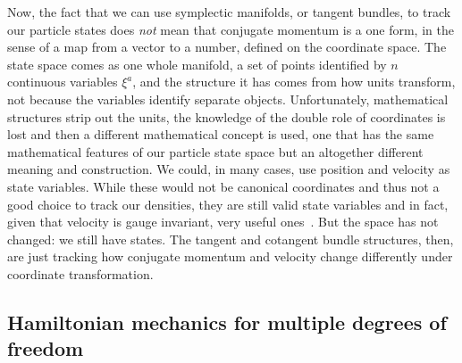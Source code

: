 \documentclass[11pt]{elsarticle}
\begin{document}
Now, the fact that we can use symplectic manifolds, or tangent bundles, to track our particle states does \emph{not} mean that conjugate momentum is a one form, in the sense of a map from a vector to a number, defined on the coordinate space. The state space comes as one whole manifold, a set of points identified by $n$ continuous variables $\xi^a$, and the structure it has comes from how units transform, not because the variables identify separate objects. Unfortunately, mathematical structures strip out the units, the knowledge of the double role of coordinates is lost and then a different mathematical concept is used, one that has the same mathematical features of our particle state space but an altogether different meaning and construction. We could, in many cases, use position and velocity as state variables. While these would not be canonical coordinates and thus not a good choice to track our densities, they are still valid state variables and in fact, given that velocity is gauge invariant, very useful ones~\cite{Holten}. But the space has not changed: we still have states. The tangent and cotangent bundle structures, then, are just tracking how conjugate momentum and velocity change differently under coordinate transformation.

\subsection*{Hamiltonian mechanics for multiple degrees of freedom}
\end{document}

